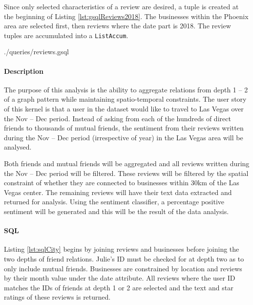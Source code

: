 Since only selected characteristics of a review are desired, a tuple is created at the beginning of Listing \ref{lst:gsqlReviews2018}. The businesses within the Phoenix area are selected first, then reviews where the date part is 2018. The review tuples are accumulated into a \texttt{ListAccum}. 


{./queries/reviews.gsql}


\paragraph{Description}
The purpose of this analysis is the ability to aggregate relations from depth 1 -- 2 of a graph pattern while maintaining spatio-temporal constraints. The user story of this kernel is that a user in the dataset would like to travel to Las Vegas over the Nov -- Dec period. Instead of asking from each of the hundreds of direct friends to thousands of mutual friends, the sentiment from their reviews written during the Nov -- Dec period (irrespective of year) in the Las Vegas area will be analysed.

Both friends and mutual friends will be aggregated and all reviews written during the Nov -- Dec period will be filtered. These reviews will be filtered by the spatial constraint of whether they are connected to businesses within 30km of the Las Vegas center. The remaining reviews will have their text data extracted and returned for analysis. Using the sentiment classifier, a percentage positive sentiment will be generated and this will be the result of the data analysis.

\paragraph{SQL}

Listing \ref{lst:sqlCity} begins by joining reviews and businesses before joining the two depths of friend relations. Julie's ID must be checked for at depth two as to only include mutual friends. Businesses are constrained by location and reviews by their month value under the date attribute. All reviews where the user ID matches the IDs of friends at depth 1 or 2 are selected and the text and star ratings of these reviews is returned.

